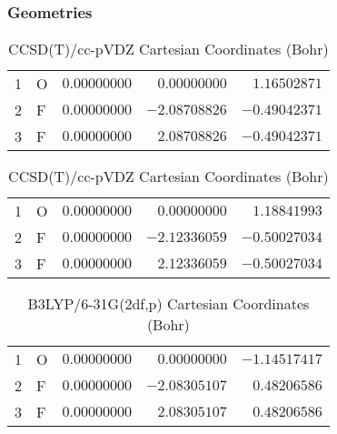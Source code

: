 \documentclass[10pt,oneside]{article}
\begin{document}
\clearpage

\subsection{}

\begin{table}[h!]
\subsubsection*{Geometries}
\begin{multicols}{2}
\centering
\caption{CCSD(T)/cc-pVTZ Cartesian Coordinates (Bohr)}
\begin{tabular}{llrrr}
\toprule
1  & O  & $ 0.00000000$ & $ 0.00000000$ & $ 1.16502871$ \\
2  & F  & $ 0.00000000$ & $-2.08708826$ & $-0.49042371$ \\
3  & F  & $ 0.00000000$ & $ 2.08708826$ & $-0.49042371$ \\
\bottomrule
\end{tabular}
\caption{CCSD(T)/cc-pVDZ Cartesian Coordinates (Bohr)}
\begin{tabular}{llrrr}
\toprule
1  & O  & $ 0.00000000$ & $ 0.00000000$ & $ 1.18841993$ \\
2  & F  & $ 0.00000000$ & $-2.12336059$ & $-0.50027034$ \\
3  & F  & $ 0.00000000$ & $ 2.12336059$ & $-0.50027034$ \\
\bottomrule
\end{tabular}
\end{multicols}
\end{table}

\begin{table}[h]
\centering
\caption{B3LYP/6-31G(2df,p) Cartesian Coordinates (Bohr)}
\begin{tabular}{llrrr}
\toprule
1  & O  & $ 0.00000000$ & $ 0.00000000$ & $-1.14517417$ \\
2  & F  & $ 0.00000000$ & $-2.08305107$ & $ 0.48206586$ \\
3  & F  & $ 0.00000000$ & $ 2.08305107$ & $ 0.48206586$ \\
\bottomrule
\end{tabular}
\end{table}
\end{document}
